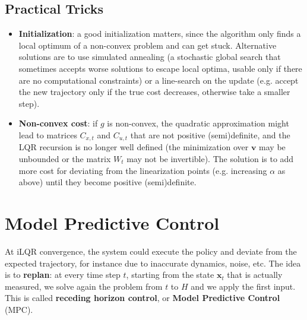 \documentclass[10pt, a4paper]{report}
\begin{document}
\subsection{Practical Tricks}
\begin{itemize}
    \item \textbf{Initialization}: a good initialization matters, since the algorithm only finds a local optimum of a non-convex problem and can get stuck. Alternative solutions are to use simulated annealing (a stochastic global search that sometimes accepts worse solutions to escape local optima, usable only if there are no computational constraints) or a line-search on the update (e.g. accept the new trajectory only if the true cost decreases, otherwise take a smaller step).
    \item \textbf{Non-convex cost}: if $g$ is non-convex, the quadratic approximation might lead to matrices $C_{x,t}$ and $C_{u,t}$ that are not positive (semi)definite, and the LQR recursion is no longer well defined (the minimization over $\mathbf v$ may be unbounded or the matrix $W_t$ may not be invertible). The solution is to add more cost for deviating from the linearization points (e.g. increasing $\alpha$ as above) until they become positive (semi)definite.
\end{itemize}

\section{Model Predictive Control}
At iLQR convergence, the system could execute the policy and deviate from the expected trajectory, for instance due to inaccurate dynamics, noise, etc. The idea is to \textbf{replan}: at every time step $t$, starting from the state $\mathbf x_t$ that is actually measured, we solve again the problem from $t$ to $H$ and we apply the first input. This is called \textbf{receding horizon control}, or \textbf{Model Predictive Control} (MPC).
\end{document}
